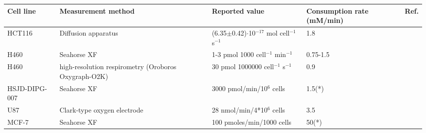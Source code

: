 \documentclass[11pt,a4paper]{article}
\begin{document}
\begin{table}[h!]
\begin{center}
\begin{tabular}{ |p{18mm}|p{26mm}|p{30mm}|p{25mm}|p{7mm}| }
 \hline

 \textbf{Cell line}  & \textbf{Measurement method} & Reported  value & \textbf{Consumption rate} (mM/min)  & Ref. \\
 \hline
 HCT116 & Diffusion apparatus & (6.35$\pm$0.42)$\cdot$10$^{-17}$ mol cell$^{-1}$ s$^{-1}$& 1.8 & \cite{Mao2018}\\
 \hline
  H460 & Seahorse XF &  1-3 pmol 1000 cell$^{-1}$ min$^{-1}$& 0.75-1.5 & \cite{Jiang2016}\\
 \hline
   H460 & high-resolution respirometry (Oroboros Oxygraph-O2K) &  30 pmol 1000000 cell$^{-1}$ s$^{-1}$& 0.9 & \cite{Amoedo2011}\\
 \hline
   HSJD-DIPG-007 &  Seahorse XF & 3000 pmol/min/10$^6$ cells & 1.5(*) & \cite{Shen2020}\\
 \hline
   U87 &  Clark-type oxygen electrode & 28 nmol/min/4*10$^6$ cells & 3.5 & \cite{Zhou2011}\\
 \hline
    MCF-7 &  Seahorse XF & 100 pmoles/min/1000 cells & 50(*) & \cite{Zhuang2014}\\
 \hline

 
 \end{tabular}
 \end{center}
 \end{table}

\end{document}
